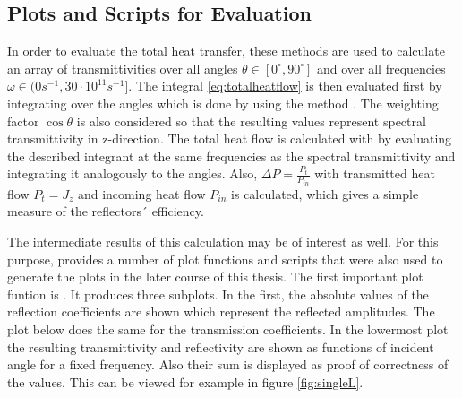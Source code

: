 

\subsection{Plots and Scripts for Evaluation}
In order to evaluate the total heat transfer, these methods are used to
calculate an array of transmittivities over all angles
$\theta\in[0^{\circ},90^{\circ}]$ and over all frequencies
$\omega \in (0\si{s^{-1}}, 30\cdot 10^{11}\si{s^{-1}}] $. The integral
\ref{eq:totalheatflow} is then evaluated first by integrating over the angles
which is done by  using the method
. The weighting factor $\cos \theta$ is also considered so
that the resulting values represent spectral transmittivity in z-direction.
The total heat flow is calculated with  by evaluating
the described integrant at the same frequencies as the spectral transmittivity
and integrating it analogously to the angles. Also,
$\Delta P=\frac{P_{t}}{P_{in}}$ with transmitted heat flow $P_{t}=J_z$ and
incoming heat flow $P_{in}$ is calculated, which gives a simple measure of the
reflectors´ efficiency.

The intermediate results of this calculation may be of interest as well. For
this purpose,  provides a number of plot functions and
scripts that were also used to generate the plots in the later course of this
thesis. The first important plot funtion is .
It produces three subplots. In the first, the absolute values of the reflection
coefficients are shown which represent the reflected amplitudes. The plot below
does the same for the transmission coefficients. In the lowermost plot the
resulting transmittivity and reflectivity are shown as functions of
incident angle for a fixed frequency. Also their sum is displayed as proof of
correctness of the values. This can be viewed for example in figure 
\ref{fig:singleL}.

